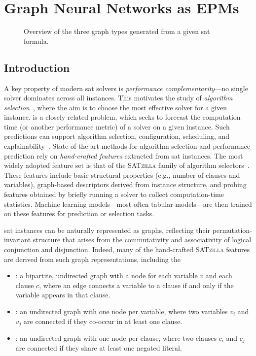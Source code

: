 
\chapter{Graph Neural Networks as EPMs}
\label{ch:ch06:gnns_epms}
\providecommand{\gb}{GraphBench}

\begin{figure}[t]
	\centering
	\resizebox{\linewidth}{!}{}
	\caption[Overview of SAT graph types]{Overview of the three graph types generated from a given \gls{sat} formula.
		\label{fig:ch06:sat}}
\end{figure}

\section{Introduction}
A key property of modern \gls{sat} solvers is \textit{performance complementarity}---no single solver dominates across all instances. This motivates the study of \emph{algorithm selection}~\citep{Rice76b,XuEtAl08b}, where the aim is to choose the most effective solver for a given instance.  is a closely related problem, which seeks to forecast the computation time (or another performance metric) of a solver on a given instance. Such predictions can support algorithm selection, configuration, scheduling, and explainability~\citep{HutEtAl14c}. State-of-the-art methods for algorithm selection and performance prediction rely on \textit{hand-crafted features} extracted from \gls{sat} instances. The most widely adopted feature set is that of the \textsc{SATzilla} family of algorithm selectors~\citep{NudEtAl04b,HutEtAl14c,ShaHoo24b}. These features include basic structural properties (e.g., number of clauses and variables), graph-based descriptors derived from instance structure, and probing features obtained by briefly running a solver to collect computation-time statistics. Machine learning models---most often tabular models---are then trained on these features for prediction or selection tasks.

\Gls{sat} instances can be naturally represented as graphs, reflecting their permutation-invariant structure that arises from the commutativity and associativity of logical conjunction and disjunction. Indeed, many of the hand-crafted \textsc{SATzilla} features are derived from such graph representations, including the
\begin{itemize}
	\item {}: a bipartite, undirected graph with a node for each variable $v$ and each clause $c$, where an edge connects a variable to a clause if and only if the variable appears in that clause.

	\item {}: an undirected graph with one node per variable, where two variables $v_i$ and $v_j$ are connected if they co-occur in at least one clause.

	\item {}: an undirected graph with one node per clause, where two clauses $c_i$ and $c_j$ are connected if they share at least one negated literal.
\end{itemize}

